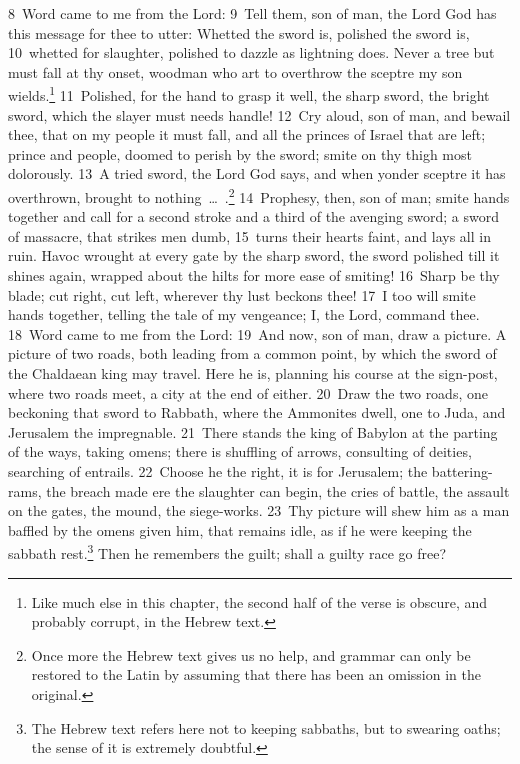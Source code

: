 \documentclass[10pt]{book} %
\begin{document}
\textcolor{benred8}{8}~Word came to me from the Lord: \textcolor{benred8}{9}~Tell them, son of man, the Lord God has this message for thee to utter: Whetted the sword is, polished the sword is, \textcolor{benred8}{10}~whetted for slaughter, polished to dazzle as lightning does. Never a tree but must fall at thy onset, woodman who art to overthrow the sceptre my son wields.\footnote[1]{Like much else in this chapter, the second half of the verse is obscure, and probably corrupt, in the Hebrew text.} \textcolor{benred8}{11}~Polished, for the hand to grasp it well, the sharp sword, the bright sword, which the slayer must needs handle! \textcolor{benred8}{12}~Cry aloud, son of man, and bewail thee, that on my people it must fall, and all the princes of Israel that are left; prince and people, doomed to perish by the sword; smite on thy thigh most dolorously. \textcolor{benred8}{13}~A tried sword, the Lord God says, and when yonder sceptre it has overthrown, brought to nothing~\ldots\ .\footnote[2]{Once more the Hebrew text gives us no help, and grammar can only be restored to the Latin by assuming that there has been an omission in the original.} \textcolor{benred8}{14}~Prophesy, then, son of man; smite hands together and call for a second stroke and a third of the avenging sword; a sword of massacre, that strikes men dumb, \textcolor{benred8}{15}~turns their hearts faint, and lays all in ruin. Havoc wrought at every gate by the sharp sword, the sword polished till it shines again, wrapped about the hilts for more ease of smiting! \textcolor{benred8}{16}~Sharp be thy blade; cut right, cut left, wherever thy lust beckons thee! \textcolor{benred8}{17}~I too will smite hands together, telling the tale of my vengeance; I, the Lord, command thee.
\textcolor{benred8}{18}~Word came to me from the Lord: \textcolor{benred8}{19}~And now, son of man, draw a picture. A picture of two roads, both leading from a common point, by which the sword of the Chaldaean king may travel. Here he is, planning his course at the sign-post, where two roads meet, a city at the end of either. \textcolor{benred8}{20}~Draw the two roads, one beckoning that sword to Rabbath, where the Ammonites dwell, one to Juda, and Jerusalem the impregnable. \textcolor{benred8}{21}~There stands the king of Babylon at the parting of the ways, taking omens; there is shuffling of arrows, consulting of deities, searching of entrails. \textcolor{benred8}{22}~Choose he the right, it is for Jerusalem; the battering-rams, the breach made ere the slaughter can begin, the cries of battle, the assault on the gates, the mound, the siege-works. \textcolor{benred8}{23}~Thy picture will shew him as a man baffled by the omens given him, that remains idle, as if he were keeping the sabbath rest.\footnote[3]{The Hebrew text refers here not to keeping sabbaths, but to swearing oaths; the sense of it is extremely doubtful.} Then he remembers the guilt; shall a guilty race go free?
\end{document}
